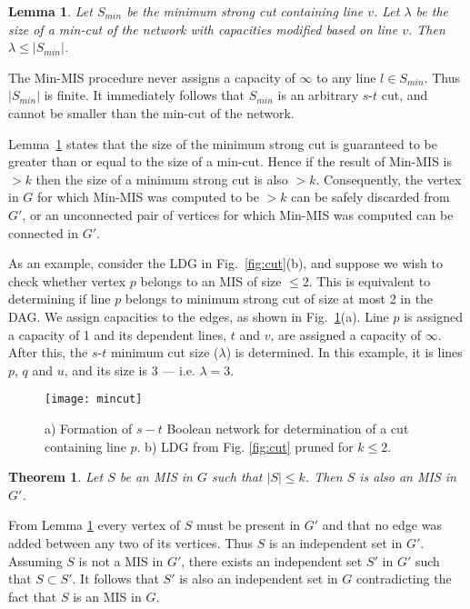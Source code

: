 \documentclass[journal]{IEEEtran}
\newtheorem{lemma}{Lemma}
\newtheorem{theorem}{Theorem}
\begin{document}
\begin{lemma} 
\label{lem:mincondition} 
Let $S_{min}$ be the minimum strong cut containing line $v$. Let $\lambda$ be the size of a min-cut of the network with capacities modified based on line $v$. Then $\lambda \leq |S_{min}|$.  
\end{lemma}
\begin{IEEEproof}
The Min-MIS procedure never assigns a capacity of $\infty$ to any line $l \in S_{min}$. Thus $|S_{min}|$ is finite. It immediately follows that $S_{min}$ is an arbitrary $s$-$t$ cut, and cannot be smaller than the min-cut of the network. 
\end{IEEEproof}

Lemma~\ref{lem:mincondition} states that the size of the minimum strong cut is guaranteed to be greater than or equal to the size of a min-cut. Hence if the result of Min-MIS is $>k$ then the size of a minimum strong cut is also $>k$. Consequently, the vertex in $G$ for which Min-MIS was computed to be $> k$ can be safely discarded from $G'$, or an unconnected pair of vertices for which Min-MIS was computed can be connected in $G'$. 

As an example, consider the  LDG in Fig.\ \ref{fig:cut}(b), and suppose we wish to check whether vertex $p$ belongs to an MIS of size $\leq 2$. This is equivalent to determining if line $p$ belongs to minimum strong cut of size at most 2 in the DAG.  We assign capacities to the edges, as shown in Fig.\ \ref{fig:mincut}(a).  Line $p$ is assigned a capacity of 1 and its dependent lines, $t$ and $v$, are assigned a capacity of $\infty$.  After this, the $s$-$t$ minimum cut size ($\lambda$) is determined. In this example, it is lines $p$, $q$ and $u$, and its size is 3 --- i.e. $\lambda = 3$.

\begin{figure}[h]
\centering
\texttt{[image: mincut]}
\caption{a) Formation of $s-t$ Boolean network for determination of a  cut containing line $p$. b) LDG from Fig. \ref{fig:cut} pruned for
  $k \leq 2$.}
\label{fig:mincut}
\end{figure}

\begin{theorem}
\label{thm:main}
Let $S$ be an MIS in $G$ such that $|S| \leq k$. Then $S$ is also an MIS in $G'$.
\end{theorem}
\begin{IEEEproof}
From Lemma \ref{lem:mincondition} every vertex of $S$ must be present in $G'$ and that no edge was added between any two of its vertices. Thus $S$ is an independent set in $G'$. Assuming $S$ is not a MIS in $G'$, there exists an independent set $S'$ in $G'$ such that $S \subset S'$. It follows that $S'$ is also an independent set in $G$ contradicting the fact that $S$ is an MIS in $G$.
\end{IEEEproof}
\end{document}

